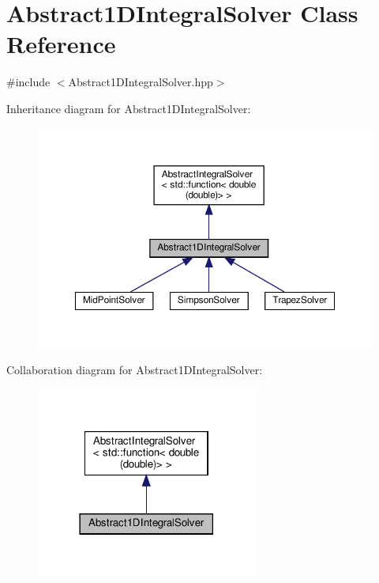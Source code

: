 \hypertarget{class_abstract1_d_integral_solver}{}\section{Abstract1\+D\+Integral\+Solver Class Reference}
\label{class_abstract1_d_integral_solver}


{\ttfamily \#include $<$Abstract1\+D\+Integral\+Solver.\+hpp$>$}



Inheritance diagram for Abstract1\+D\+Integral\+Solver\+:
\nopagebreak
\begin{figure}[H]
\begin{center}
\leavevmode
\includegraphics[width=350pt]{class_abstract1_d_integral_solver__inherit__graph}
\end{center}
\end{figure}


Collaboration diagram for Abstract1\+D\+Integral\+Solver\+:
\nopagebreak
\begin{figure}[H]
\begin{center}
\leavevmode
\includegraphics[width=206pt]{class_abstract1_d_integral_solver__coll__graph}
\end{center}
\end{figure}
